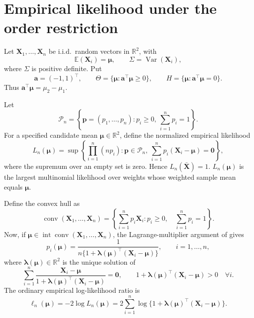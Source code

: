 \documentclass[11pt]{article}
\theoremstyle{remark}
\newcommand{\R}{\mathbb{R}}
\newcommand{\E}{\mathbb{E}}
\newcommand{\conv}{\operatorname{conv}}
\newcommand{\interior}{\operatorname{int}}
\begin{document}
\section{Empirical likelihood under the order restriction}


Let $\boldsymbol{X}_1,\ldots,\boldsymbol{X}_n$ be i.i.d.\ random vectors in $\R^2$, with
$$
  \E(\boldsymbol{X}_i)=\boldsymbol{\mu},\qquad
  \Sigma=\operatorname{Var}(\boldsymbol{X}_i),
$$
where $\Sigma$ is positive definite.  Put
$$
  \boldsymbol{a}=(-1,1)^\top,\qquad
  \Theta=\{\boldsymbol{\mu}:\boldsymbol{a}^\top\boldsymbol{\mu}\geq0\},\qquad
  H=\{\boldsymbol{\mu}:\boldsymbol{a}^\top\boldsymbol{\mu}=0\}.
$$
Thus $\boldsymbol{a}^\top\boldsymbol{\mu}=\mu_2-\mu_1$.

Let
$$
  \mathcal P_n
  =
  \left\{\boldsymbol{p}=(p_1,\ldots,p_n):p_i\geq0,\ 
  \sum_{i=1}^np_i=1\right\}.
$$
For a specified candidate mean $\boldsymbol{\mu}\in\R^2$, define the normalized empirical likelihood
$$
  L_n(\boldsymbol{\mu})
  =
  \sup\left\{
  \prod_{i=1}^n(np_i):
  \boldsymbol{p}\in\mathcal P_n,\ 
  \sum_{i=1}^np_i(\boldsymbol{X}_i-\boldsymbol{\mu})=\boldsymbol{0}
  \right\},
$$
where the supremum over an empty set is zero.  Hence $L_n(\bar{\boldsymbol{X}})=1$.  $L_n(\boldsymbol{\mu})$ is the largest multinomial likelihood over weights whose weighted sample mean equals $\boldsymbol{\mu}$.

Define the convex hull as
$$
\operatorname{conv}(\boldsymbol{X}_1,\ldots,\boldsymbol{X}_n)
=
\left\{
\sum_{i=1}^{n} p_i\boldsymbol{X}_i
:
p_i\geq 0,\quad
\sum_{i=1}^{n}p_i=1
\right\}.
$$
Now, if $\boldsymbol{\mu}\in\interior\conv(\boldsymbol{X}_1,\ldots,\boldsymbol{X}_n)$, the Lagrange-multiplier argument of \citet{owen1990,owen2001} gives
$$
  p_i(\boldsymbol{\mu})
  =
  \frac{1}{n\{1+\boldsymbol{\lambda}(\boldsymbol{\mu})^\top(\boldsymbol{X}_i-\boldsymbol{\mu})\}},
  \qquad i=1,\ldots,n,
$$
where $\boldsymbol{\lambda}(\boldsymbol{\mu})\in\R^2$ is the unique solution of
$$
  \sum_{i=1}^n
  \frac{\boldsymbol{X}_i-\boldsymbol{\mu}}{1+\boldsymbol{\lambda}(\boldsymbol{\mu})^\top(\boldsymbol{X}_i-\boldsymbol{\mu})}
  =\boldsymbol{0},
  \qquad
  1+\boldsymbol{\lambda}(\boldsymbol{\mu})^\top(\boldsymbol{X}_i-\boldsymbol{\mu})>0\quad\forall i.
$$
The ordinary empirical log-likelihood ratio is
$$
  \ell_n(\boldsymbol{\mu})
  =
  -2\log L_n(\boldsymbol{\mu})
  =
  2\sum_{i=1}^n
  \log\{1+\boldsymbol{\lambda}(\boldsymbol{\mu})^\top(\boldsymbol{X}_i-\boldsymbol{\mu})\}.
$$
\end{document}
